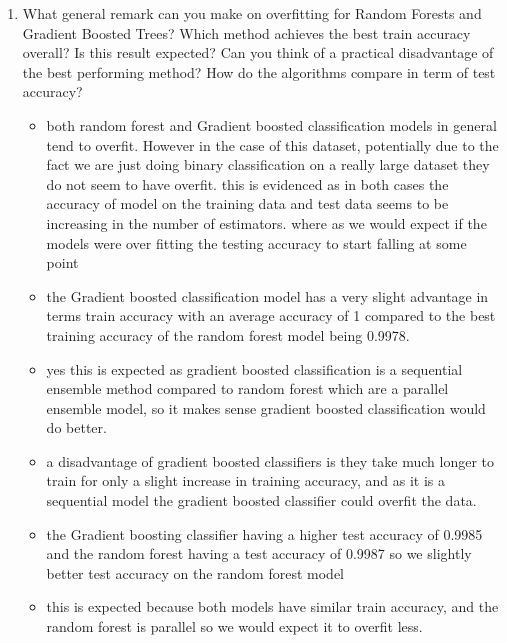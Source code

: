 \documentclass{article}
\theoremstyle{plain}
\theoremstyle{definition}
\begin{document}
\begin{enumerate}
\item What general remark can you make on overfitting for Random Forests and Gradient Boosted Trees? Which method achieves the best train accuracy overall? Is this result expected? 
Can you think of a practical disadvantage of the best performing method? How do the algorithms compare in term of test accuracy? \\
\begin{itemize}
    \color{blue}
    \item both random forest and Gradient boosted classification models in general tend to overfit. However in the case of this dataset, potentially due to the fact we are just doing binary classification on a really large dataset they do not seem to have overfit. this is evidenced as in both cases the accuracy of model on the training data and test data seems to be increasing in the number of estimators. where as we would expect if the models were over fitting the testing accuracy to start falling at some point 
    \item the Gradient boosted classification model has a very slight  advantage in terms train accuracy with an average accuracy of 1 compared to the best training accuracy of the random forest model being 0.9978.
    \item yes this is expected as gradient boosted classification is a sequential ensemble method compared to random forest which are a parallel ensemble model, so it makes sense gradient boosted classification would do better. 
    \item a disadvantage of gradient boosted classifiers is they take much longer to train for only a slight increase in training accuracy, and as it is a sequential model the gradient boosted classifier could overfit the data.  
    \item the Gradient boosting classifier having a higher test accuracy of 0.9985 and the random forest having a test accuracy of 0.9987 so we slightly better test accuracy on the random forest model
    \item this is expected because both models have similar train accuracy, and the random forest is parallel so we would expect it to overfit less. 
\end{itemize}


\setcounter{saveenum}{\value{enumi}}
\end{enumerate}
\end{document}
